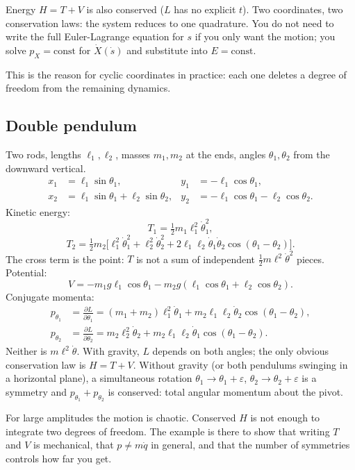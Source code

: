 \documentclass[11pt]{article}
\numberwithin{equation}{section}
\newcommand{\qdot}{\dot{q}}
\newcommand{\pd}[2]{\frac{\partial #1}{\partial #2}}
\begin{document}
Energy $H=T+V$ is also conserved ($L$ has no explicit $t$). Two coordinates, two conservation laws: the system reduces to one quadrature. You do not need to write the full Euler-Lagrange equation for $s$ if you only want the motion; you solve $p_X=\mathrm{const}$ for $\dot X(\dot s)$ and substitute into $E=\mathrm{const}$.

This is the reason for cyclic coordinates in practice: each one deletes a degree of freedom from the remaining dynamics.

\subsection{Double pendulum}

Two rods, lengths $\ell_1,\ell_2$, masses $m_1,m_2$ at the ends, angles $\theta_1,\theta_2$ from the downward vertical.
\[
\begin{aligned}
x_1 &= \ell_1\sin\theta_1, &
y_1 &= -\ell_1\cos\theta_1,\\
x_2 &= \ell_1\sin\theta_1+\ell_2\sin\theta_2, &
y_2 &= -\ell_1\cos\theta_1-\ell_2\cos\theta_2.
\end{aligned}
\]
Kinetic energy:
\[
T_1 = \tfrac12 m_1\ell_1^2\dot\theta_1^2,
\]
\[
T_2 = \tfrac12 m_2\bigl[
\ell_1^2\dot\theta_1^2 + \ell_2^2\dot\theta_2^2
+ 2\ell_1\ell_2\dot\theta_1\dot\theta_2\cos(\theta_1-\theta_2)
\bigr].
\]
The cross term is the point: $T$ is not a sum of independent $\tfrac12 m\ell^2\dot\theta^2$ pieces. Potential:
\[
V = -m_1 g\ell_1\cos\theta_1 - m_2 g(\ell_1\cos\theta_1+\ell_2\cos\theta_2).
\]
Conjugate momenta:
\begin{align*}
p_{\theta_1}
&= \pd{L}{\dot\theta_1}
= (m_1+m_2)\ell_1^2\dot\theta_1
+ m_2\ell_1\ell_2\dot\theta_2\cos(\theta_1-\theta_2),\\
p_{\theta_2}
&= \pd{L}{\dot\theta_2}
= m_2\ell_2^2\dot\theta_2
+ m_2\ell_1\ell_2\dot\theta_1\cos(\theta_1-\theta_2).
\end{align*}
Neither is $m\ell^2\dot\theta$. With gravity, $L$ depends on both angles; the only obvious conservation law is $H=T+V$. Without gravity (or both pendulums swinging in a horizontal plane), a simultaneous rotation $\theta_1\to\theta_1+\varepsilon$, $\theta_2\to\theta_2+\varepsilon$ is a symmetry and $p_{\theta_1}+p_{\theta_2}$ is conserved: total angular momentum about the pivot.

For large amplitudes the motion is chaotic. Conserved $H$ is not enough to integrate two degrees of freedom. The example is there to show that writing $T$ and $V$ is mechanical, that $p\neq m\qdot$ in general, and that the number of symmetries controls how far you get.
\end{document}
